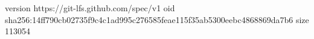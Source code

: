 version https://git-lfs.github.com/spec/v1
oid sha256:14ff790cb02735f9c4c1ad995c276585feae115f35ab5300eebc4868869da7b6
size 113054
